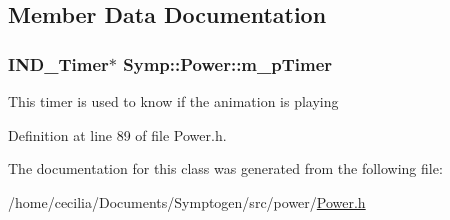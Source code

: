 \subsection{Member Data Documentation}
\hypertarget{class_symp_1_1_power_a8f421a13e9e62dac404c6c1ef4862045}{
\subsubsection[{m\-\_\-p\-Timer}]{\setlength{\rightskip}{0pt plus 5cm}I\-N\-D\-\_\-\-Timer$\ast$ Symp\-::\-Power\-::m\-\_\-p\-Timer\hspace{0.3cm}{\ttfamily [protected]}}}\label{class_symp_1_1_power_a8f421a13e9e62dac404c6c1ef4862045}
This timer is used to know if the animation is playing 

Definition at line 89 of file Power.\-h.



The documentation for this class was generated from the following file\-:\begin{DoxyCompactItemize}
\item 
/home/cecilia/\-Documents/\-Symptogen/src/power/\hyperlink{_power_8h}{Power.\-h}\end{DoxyCompactItemize}
